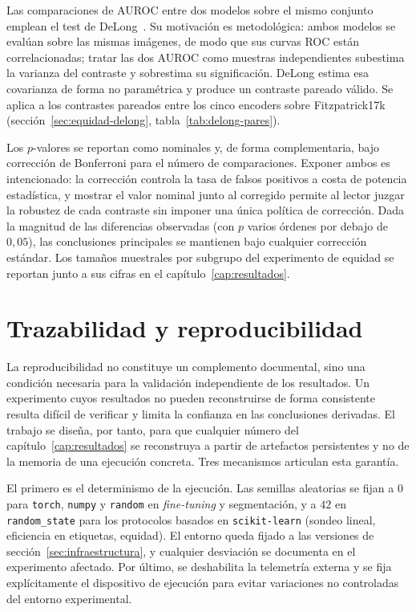 Las comparaciones de AUROC entre dos modelos sobre el mismo conjunto
emplean el test de DeLong~\cite{delong1988}. Su motivación es
metodológica: ambos modelos se evalúan sobre las mismas imágenes, de
modo que sus curvas ROC están correlacionadas; tratar las dos AUROC
como muestras independientes subestima la varianza del contraste y
sobrestima su significación. DeLong estima esa covarianza de forma
no paramétrica y produce un contraste pareado válido. Se aplica a
los contrastes pareados entre los cinco encoders sobre Fitzpatrick17k
(sección~\ref{sec:equidad-delong}, tabla~\ref{tab:delong-pares}).

Los $p$-valores se reportan como nominales y, de forma
complementaria, bajo corrección de Bonferroni para el número de
comparaciones. Exponer ambos es intencionado: la corrección controla
la tasa de falsos positivos a costa de potencia estadística, y
mostrar el valor nominal junto al corregido permite al lector juzgar
la robustez de cada contraste sin imponer una única política de
corrección. Dada la magnitud de las diferencias observadas (con $p$
varios órdenes por debajo de $0{,}05$), las conclusiones principales
se mantienen bajo cualquier corrección estándar. Los tamaños
muestrales por subgrupo del experimento de equidad se reportan junto
a sus cifras en el capítulo~\ref{cap:resultados}.

\section{Trazabilidad y reproducibilidad}
\label{sec:reproducibilidad}

La reproducibilidad no constituye un complemento documental, sino
una condición necesaria para la validación independiente de los
resultados. Un experimento cuyos resultados no pueden reconstruirse
de forma consistente resulta difícil de verificar y limita la
confianza en las conclusiones derivadas. El trabajo se diseña, por
tanto, para que cualquier número del capítulo~\ref{cap:resultados}
se reconstruya a partir de artefactos persistentes y no de la
memoria de una ejecución concreta. Tres mecanismos articulan esta
garantía.

El primero es el determinismo de la ejecución. Las semillas
aleatorias se fijan a $0$ para \texttt{torch}, \texttt{numpy} y
\texttt{random} en \emph{fine-tuning} y segmentación, y a $42$ en
\texttt{random\_state} para los protocolos basados en
\texttt{scikit-learn} (sondeo lineal, eficiencia en etiquetas,
equidad). El entorno queda fijado a las versiones de
sección~\ref{sec:infraestructura}, y cualquier desviación se
documenta en el experimento afectado. Por último, se deshabilita la
telemetría externa y se fija explícitamente el dispositivo de
ejecución para evitar variaciones no controladas del entorno
experimental.

